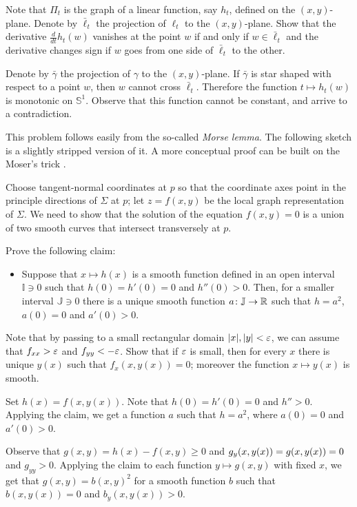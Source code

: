 Note that $\Pi_t$ is the graph of a linear function, say $h_t$, defined on the $(x, y)$-plane.
Denote by $\bar\ell_t$ the projection of $\ell_t$ to the $(x, y)$-plane.
Show that the derivative $\tfrac{d}{dt}h_t(w)$ vanishes at the point $w$ if and only if $w\in \bar\ell_t$ 
and the derivative changes sign if $w$ goes from one side of $\bar\ell_t$ to the other.

Denote by $\bar\gamma$ the projection of $\gamma$ to the $(x, y)$-plane.
If $\bar\gamma$ is star shaped with respect to a point $w$, then $w$ cannot cross $\bar\ell_t$.
Therefore the function $t\mapsto h_t(w)$ is monotonic on $\mathbb{S}^1$.
Observe that this function cannot be constant, and arrive to a contradiction.

This problem follows easily from the so-called \emph{Morse lemma}.
The following sketch is a slightly stripped version of it.
A more conceptual proof can be built on the Moser's trick \cite{palais}.

\medskip

Choose tangent-normal coordinates at $p$ so that the coordinate axes point in the principle directions of $\Sigma$ at $p$;
let $z=f(x,y)$ be the local graph representation of $\Sigma$.
We need to show that the solution of the equation $f(x,y)=0$ is a union of two smooth curves that intersect transversely at $p$.

Prove the following claim:
\begin{itemize}
 \item Suppose that  $x\mapsto h(x)$ is a smooth function defined in an open interval $\mathbb{I}\ni0$ such that $h(0)=h'(0)=0$ and $h''(0)>0$.
 Then, for a smaller interval $\mathbb{J}\ni0$ there is a unique smooth function $a\colon\mathbb{J}\to\mathbb{R}$ such that $h=a^2$, $a(0)=0$ and $a'(0)> 0$.
\end{itemize}
Note that by passing to a small rectangular domain $|x|,|y|<\varepsilon$, we can assume that $f_{xx}>\varepsilon$ and $f_{yy}<-\varepsilon$. 
Show that if $\varepsilon$ is small, then for every $x$ there is unique $y(x)$ such that $f_x(x,y(x))=0$; 
moreover the function $x\mapsto y(x)$ is smooth.

Set $h(x)=f(x,y(x))$.
Note that $h(0)=h'(0)=0$ and $h''>0$.
Applying the claim, we get a function $a$ such that $h=a^2$, where $a(0)=0$ and $a'(0)>0$.

Observe that $g(x,y)=h(x)-f(x,y)\ge 0$ and $g_y(x,y(x))\z=g(x,y(x))\z=0$ and $g_{yy}>0$.
Applying the claim to each function $y\mapsto g(x,y)$ with fixed $x$, we get that $g(x,y)=b(x,y)^2$ for a smooth function $b$ such that 
$b(x,y(x))=0$ and $b_y(x,y(x))>0$.

